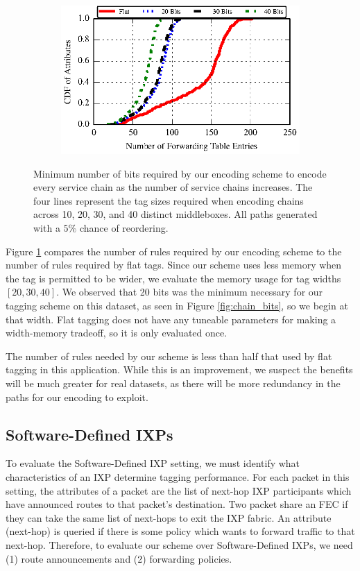 \begin{figure}[t!] 
\begin{minipage}{1\linewidth}
\begin{subfigure}[b]{0.96\linewidth}
\includegraphics[width=\linewidth]{figures/attr_cdf}
\end{subfigure} 
\end{minipage} 
\caption{Minimum number of bits required by our encoding scheme to encode every service chain as the number of service chains increases. The four lines represent the tag sizes required when encoding chains across 10, 20, 30, and 40 distinct middleboxes. All paths generated with a $5\%$ chance of reordering.}
\label{fig:chain_rules}
\end{figure}

Figure \ref{fig:chain_rules} compares the number of rules required by our encoding scheme to the number of rules required by flat tags. Since our scheme uses less memory when the tag is permitted to be wider, we evaluate the memory usage for tag widths $[20,30,40]$. We observed that 20 bits was the minimum necessary for our tagging scheme on this dataset, as seen in Figure \ref{fig:chain_bits}, so we begin at that width. Flat tagging does not have any tuneable parameters for making a width-memory tradeoff, so it is only evaluated once.

The number of rules needed by our scheme is less than half that used by flat tagging in this application. While this is an improvement, we suspect the benefits will be much greater for real datasets, as there will be more redundancy in the paths for our encoding to exploit.


\subsection{Software-Defined IXPs}
To evaluate the Software-Defined IXP setting, we must identify what characteristics of an IXP determine tagging performance. For each packet in this setting, the attributes of a packet are the list of next-hop IXP participants which have announced routes to that packet's destination. Two packet share an FEC if they can take the same list of next-hops to exit the IXP fabric. An attribute (next-hop) is queried if there is some policy which wants to forward traffic to that next-hop. Therefore, to evaluate our scheme over Software-Defined IXPs, we need (1) route announcements and (2) forwarding policies. 


